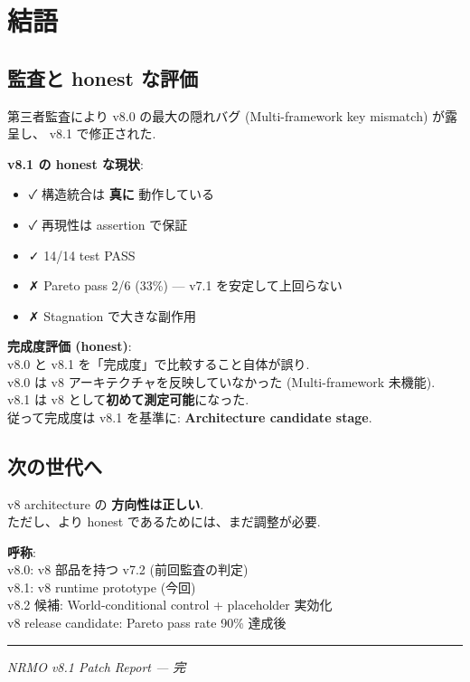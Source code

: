 \documentclass[a4paper,11pt]{report}
\begin{document}
\chapter{結語}

\section{監査と honest な評価}

第三者監査により v8.0 の最大の隠れバグ (Multi-framework key mismatch) が露呈し、
v8.1 で修正された.

\begin{summary}
\textbf{v8.1 の honest な現状}:

\begin{itemize}[leftmargin=*]
  \item ✓ 構造統合は \textbf{真に} 動作している
  \item ✓ 再現性は assertion で保証
  \item ✓ 14/14 test PASS
  \item ✗ Pareto pass 2/6 (33\%) — v7.1 を安定して上回らない
  \item ✗ Stagnation で大きな副作用
\end{itemize}

\textbf{完成度評価 (honest)}:\\
v8.0 と v8.1 を「完成度」で比較すること自体が誤り.\\
v8.0 は v8 アーキテクチャを反映していなかった (Multi-framework 未機能).\\
v8.1 は v8 として\textbf{初めて測定可能}になった.\\
従って完成度は v8.1 を基準に: \textbf{Architecture candidate stage}.
\end{summary}

\section{次の世代へ}

v8 architecture の \textbf{方向性は正しい}.\\
ただし、より honest であるためには、まだ調整が必要.

\begin{tcolorbox}[colback=navy!5, colframe=navy, width=\linewidth]
\centering
\textbf{呼称}:\\
v8.0: v8 部品を持つ v7.2 (前回監査の判定)\\
v8.1: v8 runtime prototype (今回)\\
v8.2 候補: World-conditional control + placeholder 実効化\\
v8 release candidate: Pareto pass rate 90\% 達成後
\end{tcolorbox}

\vspace{1cm}

\rule{\linewidth}{0.5pt}

\centering
\emph{NRMO v8.1 Patch Report — 完}
\end{document}
